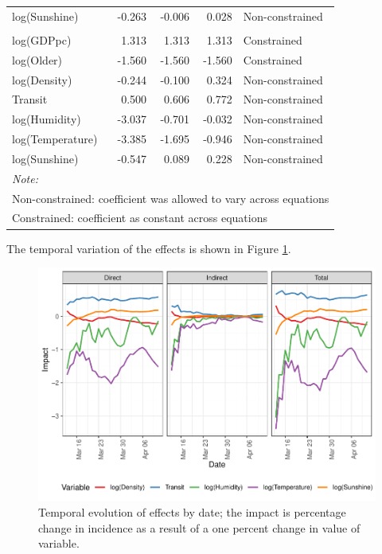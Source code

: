 \documentclass[]{elsarticle} %
\makeatletter
\def\maxwidth{\ifdim\Gin@nat@width>\linewidth\linewidth
\else\Gin@nat@width\fi}
\let\Oldincludegraphics\includegraphics
\renewcommand{\includegraphics}[1]{\Oldincludegraphics[width=\maxwidth]{#1}}
\makeatother
\begin{document}
\begin{table}
\begin{tabular}[t]{lrrrl}
\hspace{1em}log(Sunshine) & -0.263 & -0.006 & 0.028 & Non-constrained\\
\rowcolor{gray!6}  \addlinespace[0.3em]
\multicolumn{5}{l}{\textbf{Total Effects}}\\
\hspace{1em}log(GDPpc) & 1.313 & 1.313 & 1.313 & Constrained\\
\hspace{1em}log(Older) & -1.560 & -1.560 & -1.560 & Constrained\\
\rowcolor{gray!6}  \hspace{1em}log(Density) & -0.244 & -0.100 & 0.324 & Non-constrained\\
\hspace{1em}Transit & 0.500 & 0.606 & 0.772 & Non-constrained\\
\rowcolor{gray!6}  \hspace{1em}log(Humidity) & -3.037 & -0.701 & -0.032 & Non-constrained\\
\hspace{1em}log(Temperature) & -3.385 & -1.695 & -0.946 & Non-constrained\\
\rowcolor{gray!6}  \hspace{1em}log(Sunshine) & -0.547 & 0.089 & 0.228 & Non-constrained\\
\bottomrule
\multicolumn{5}{l}{\textit{Note: }}\\
\multicolumn{5}{l}{Non-constrained: coefficient was allowed to vary across equations}\\
\multicolumn{5}{l}{Constrained: coefficient as constant across equations}\\
\end{tabular}
\end{table}

The temporal variation of the effects is shown in Figure
\ref{fig:plot-impacts}.

\begin{figure}
\centering
\includegraphics{Environmental-Correlates-of-COVID19-Spain_files/figure-latex/plot-impacts-1.pdf}
\caption{\label{fig:plot-impacts}Temporal evolution of effects by date;
the impact is percentage change in incidence as a result of a one
percent change in value of variable.}
\end{figure}
\end{document}
